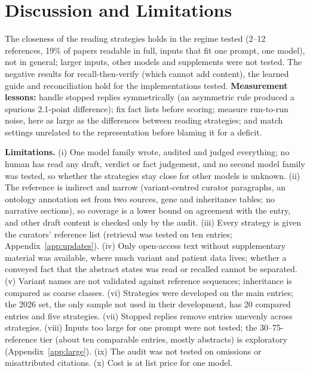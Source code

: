 \documentclass{article} %
\begin{document}
\section{Discussion and Limitations}
\label{sec:discussion}
The closeness of the reading strategies holds in the regime tested (2--12 references, 19\% of papers readable in full, inputs that fit one prompt, one model), not in general; larger inputs, other models and supplements were not tested. The negative results for recall-then-verify (which cannot add content), the learned guide and reconciliation hold for the implementations tested. \textbf{Measurement lessons:} handle stopped replies symmetrically (an asymmetric rule produced a spurious 2.1-point difference); fix fact lists before scoring; measure run-to-run noise, here as large as the differences between reading strategies; and match settings unrelated to the representation before blaming it for a deficit.

\textbf{Limitations.} (i) One model family wrote, audited and judged everything; no human has read any draft, verdict or fact judgement, and no second model family was tested, so whether the strategies stay close for other models is unknown. (ii) The reference is indirect and narrow (variant-centred curator paragraphs, an ontology annotation set from two sources, gene and inheritance tables; no narrative sections), so coverage is a lower bound on agreement with the entry, and other draft content is checked only by the audit. (iii) Every strategy is given the curators' reference list (retrieval was tested on ten entries; Appendix~\ref{app:updates}). (iv) Only open-access text without supplementary material was available, where much variant and patient data lives; whether a conveyed fact that the abstract states was read or recalled cannot be separated. (v) Variant names are not validated against reference sequences; inheritance is compared as coarse classes. (vi) Strategies were developed on the main entries; the 2026 set, the only sample not used in their development, has 20 compared entries and five strategies. (vii) Stopped replies remove entries unevenly across strategies. (viii) Inputs too large for one prompt were not tested; the 30--75-reference tier (about ten comparable entries, mostly abstracts) is exploratory (Appendix~\ref{app:large}). (ix) The audit was not tested on omissions or misattributed citations. (x) Cost is at list price for one model.
\end{document}
